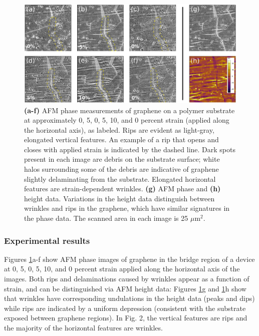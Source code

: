 \documentclass[edeposit,fullpage,draftthesis]{uiucthesis2009}
\begin{document}
        \begin{figure}
        \centering
        \includegraphics[width=\linewidth]{images/resultsanddiscussion/rippingpaper/Figure3.eps}
        \caption[AFM measurements of uniaxially strained graphene]
            {\textbf{(a-f)} AFM phase measurements of graphene on a polymer
            substrate at approximately 0, 5, 0, 5, 10, and 0 percent strain (applied along
            the horizontal axis), as labeled. Rips are evident as light-gray, elongated
            vertical features. An example of a rip that opens and closes with applied
            strain is indicated by the dashed line. Dark spots present in each image are
            debris on the substrate surface; white halos surrounding some of the debris are
            indicative of graphene slightly delaminating from the substrate. Elongated
            horizontal features are strain-dependent wrinkles. \textbf{(g)} AFM phase and
            \textbf{(h)} height data. Variations in the height data distinguish between
            wrinkles and rips in the graphene, which have similar signatures in the phase
            data. The scanned area in each image is 25 $\mu$m$^2$.}
        \label{fig:rip-afm}
        \end{figure}
   
        \subsubsection*{Experimental results}
        
        Figures \ref{fig:rip-afm}a-f show AFM phase images of graphene in the bridge region of a device
        at 0, 5, 0, 5, 10, and 0 percent strain applied along the horizontal axis of
        the images. Both rips and delaminations caused by wrinkles appear as a function
        of strain, and can be distinguished via AFM height data: Figures \ref{fig:rip-afm}g and \ref{fig:rip-afm}h show
        that wrinkles have corresponding undulations in the height data (peaks and
        dips) while rips are indicated by a uniform depression (consistent with the
        substrate exposed between graphene regions). In Fig. 2, the vertical features
        are rips and the majority of the horizontal features are wrinkles.
        
\end{document}

